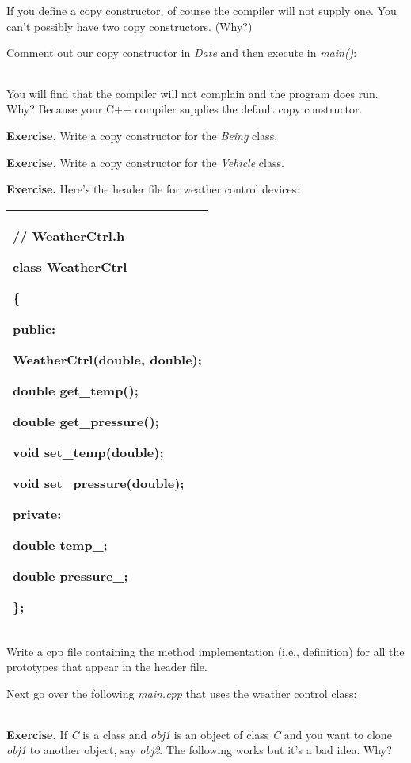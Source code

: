 \documentclass[
]{article}
\begin{document}
If you define a copy constructor, of course the compiler will not supply
one. You can't possibly have two copy constructors. (Why?)

Comment out our copy constructor in \emph{Date} and then execute in
\emph{main()}:

\begin{longtable}[]{@{}@{}}
\toprule
\endhead
\bottomrule
\end{longtable}

You will find that the compiler will not complain and the program does
run. Why? Because your C++ compiler supplies the default copy
constructor.

\textbf{Exercise.} Write a copy constructor for the \emph{Being} class.

\textbf{Exercise.} Write a copy constructor for the \emph{Vehicle}
class.

\textbf{Exercise. }Here's the header file for weather control devices:

\begin{longtable}[]{@{}l@{}}
\toprule
\endhead
\begin{minipage}[t]{0.97\columnwidth}\raggedright
// WeatherCtrl.h

class WeatherCtrl

\{

public:

WeatherCtrl(double, double);

double get\_temp();

double get\_pressure();

void set\_temp(double);

void set\_pressure(double);

private:

double temp\_;

double pressure\_;

\};\strut
\end{minipage}\tabularnewline
\bottomrule
\end{longtable}

Write a cpp file containing the method implementation (i.e., definition)
for all the prototypes that appear in the header file.

Next go over the following \emph{main.cpp} that uses the weather control
class:

\begin{longtable}[]{@{}@{}}
\toprule
\endhead
\bottomrule
\end{longtable}

\textbf{Exercise.} If \emph{C} is a class and \emph{obj1} is an object
of class \emph{C} and you want to clone \emph{obj1} to another object,
say \emph{obj2}. The following works but it's a bad idea. Why?
\end{document}
